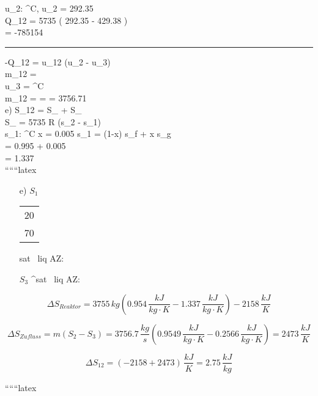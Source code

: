 u_2: ^\circ C, \quad {} \quad {} \quad u_2 = 292.35  \\

Q_{12} = 5735  \left( 292.35  - 429.38  \right) \\
\quad = -785154  \\

\noindent\rule{8cm}{0.4pt}

 \cdot -Q_{12} = \Delta u_{12} (u_2 - u_3) \\
\Delta m_{12} =  \\

u_3 =  ^\circ C \quad {}   \\

\Delta m_{12} =  =  = 3756.71  \\

e) \quad \Delta S_{12} = \Delta S_{} + \Delta S_{} \\

\Delta S_{} = 5735  \cdot \Delta R (s_2 - s_1) \\

s_1: ^\circ C \quad x = 0.005 \quad {} \quad s_1 = (1-x) \cdot s_f + x \cdot s_g \\
\quad = 0.995   + 0.005   \\
\quad = 1.337  \\

``````latex


\begin{itemize}
    \item[e)] $S_1$ \quad \begin{tabular}{c} 20 \\ 70 \end{tabular} \quad sat \, liq \quad AZ:  \, 
    \item[] $S_3$ ^\circ \quad sat \, liq \quad AZ:  \, 
\end{itemize}

\[
\Delta S_{Reaktor} = 3755 \, kg \left( 0.954 \, \frac{kJ}{kg \cdot K} - 1.337 \, \frac{kJ}{kg \cdot K} \right) - 2158 \, \frac{kJ}{K}
\]

\[
\Delta S_{Zufluss} = m \left( S_{2} - S_{3} \right) = 3756.7 \, \frac{kg}{s} \left( 0.9549 \, \frac{kJ}{kg \cdot K} - 0.2566 \, \frac{kJ}{kg \cdot K} \right) = 2473 \, \frac{kJ}{K}
\]

\[
\Delta S_{12} = \left( -2158 + 2473 \right) \, \frac{kJ}{K} = 2.75 \, \frac{kJ}{kg}
\]

``````latex


